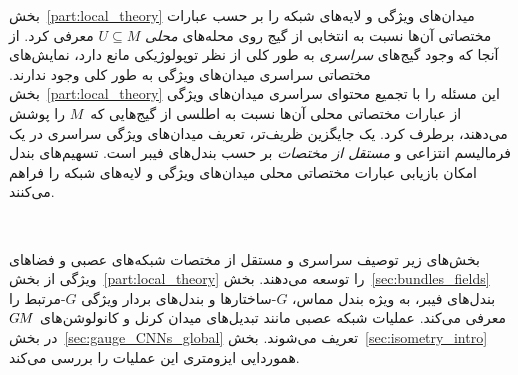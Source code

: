 
\label{part:bundle_theory}

بخش~\ref{part:local_theory} میدان‌های ویژگی و لایه‌های شبکه را بر حسب عبارات مختصاتی آن‌ها نسبت به انتخابی از گیج روی محله‌های \emph{محلی} $U\subseteq M$ معرفی کرد.
از آنجا که وجود گیج‌های \emph{سراسری} به طور کلی از نظر توپولوژیکی مانع دارد، نمایش‌های مختصاتی سراسری میدان‌های ویژگی به طور کلی وجود ندارند.
بخش~\ref{part:local_theory} این مسئله را با تجمیع محتوای سراسری میدان‌های ویژگی از عبارات مختصاتی محلی آن‌ها نسبت به اطلسی از گیج‌هایی که~$M$ را پوشش می‌دهند، برطرف کرد.
یک جایگزین ظریف‌تر، تعریف میدان‌های ویژگی سراسری در یک فرمالیسم انتزاعی و \emph{مستقل از مختصات} بر حسب بندل‌های فیبر است.
تسهیم‌های بندل امکان بازیابی عبارات مختصاتی محلی میدان‌های ویژگی و لایه‌های شبکه را فراهم می‌کنند.

\etocsettocstyle{}{} %
\localtableofcontents

~

بخش‌های زیر توصیف سراسری و مستقل از مختصات شبکه‌های عصبی و فضاهای ویژگی از بخش~\ref{part:local_theory} را توسعه می‌دهند.
بخش~\ref{sec:bundles_fields} بندل‌های فیبر، به ویژه بندل مماس، $G$-ساختارها و بندل‌های بردار ویژگی $G$-مرتبط را معرفی می‌کند.
عملیات شبکه عصبی مانند تبدیل‌های میدان کرنل و کانولوشن‌های $G\mkern-1.4muM$ در بخش~\ref{sec:gauge_CNNs_global} تعریف می‌شوند.
بخش~\ref{sec:isometry_intro} هموردایی ایزومتری این عملیات را بررسی می‌کند.